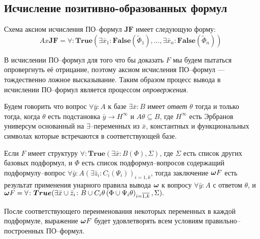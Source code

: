 \subsection{Исчисление позитивно-образованных формул}

Схема аксиом исчисления ПО--формул $\boldsymbol{JF}$ имеет следующую форму:
$$ Ax\boldsymbol{JF} = \forall\colon\boldsymbol{True}\left(\exists \bar{x}_1\colon\boldsymbol{False}\left(\widetilde{\Phi}_1\right),\ldots,\exists \bar{x}_n\colon\boldsymbol{False}\left(\widetilde{\Phi}_n\right)\right) $$

В исчислении ПО--формул для того что бы доказать $F$ мы будем пытаться опровергнуть её отрицание, поэтому аксиом исчисления ПО--формул ---  тождественно ложное высказывание. Таким образом процесс вывода в исчислении ПО--формул является процессом {\em опровержения}.

\begin{definition}
\label{ircond}
Будем говорить что вопрос $\forall \bar{y}\colon A$ к базе $\exists \bar{x}\colon B$ имеет {\em ответ} $\theta$  тогда и только тогда, когда $\theta$ есть подстановка $\bar{y} \rightarrow H^{\infty}$ и $A\theta \subseteq B$, где $H^{\infty}$ есть Эрбранов универсум основанный на $\exists$--переменных из $\bar{x}$, константных и функциональных символах которые встречаются в соответствующей базе.
\end{definition}


\begin{definition}
\label{omega}
Если $F$ имеет структуру $\forall\colon\boldsymbol{True}\left(\exists \bar{x}\colon B\left(\Phi\right),\Sigma\right)$, где $\Sigma$ есть список других базовых подформул, и $\Phi$ есть список подформул--вопросов содержащий подформулу--вопрос $\forall \bar{y}\colon A(\exists \bar{z}_i\colon C_i\left(\Psi_i\right))_{i=\overline{1,k}}$, тогда заключение $\boldsymbol{\omega} F$ есть результат применения унарного правила вывода $\boldsymbol{\omega}$ к вопросу $\forall \bar{y}\colon A$ с ответом $\theta$, и $\boldsymbol{\omega} F = \forall\colon\boldsymbol{True}(\exists \bar{x} \cup \bar{z}_i\colon B \cup C_i\theta\left(\Phi \cup \Psi_i\theta\right)_{i=\overline{1,k}},\Sigma).$

\end{definition}

После соответствующего переименования некоторых переменных в каждой подформуле, выражение $\boldsymbol{\omega} F$ будет удовлетворять всем условиям правильно--построенных ПО--формул.

